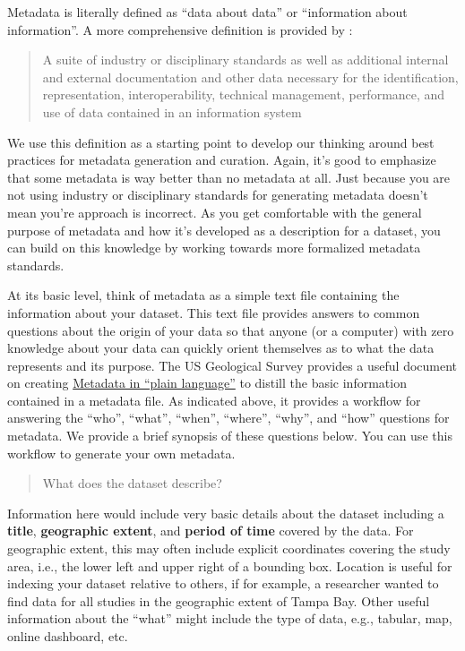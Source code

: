 \documentclass[
]{book}
\begin{document}
Metadata is literally defined as ``data about data'' or ``information about information''. A more comprehensive definition is provided by \citet{Gilliland16}:

\begin{quote}
A suite of industry or disciplinary standards as well as additional internal and external documentation and other data necessary for the identification, representation, interoperability, technical management, performance, and use of data contained in an information system
\end{quote}

We use this definition as a starting point to develop our thinking around best practices for metadata generation and curation. Again, it's good to emphasize that some metadata is way better than no metadata at all. Just because you are not using industry or disciplinary standards for generating metadata doesn't mean you're approach is incorrect. As you get comfortable with the general purpose of metadata and how it's developed as a description for a dataset, you can build on this knowledge by working towards more formalized metadata standards.

At its basic level, think of metadata as a simple text file containing the information about your dataset. This text file provides answers to common questions about the origin of your data so that anyone (or a computer) with zero knowledge about your data can quickly orient themselves as to what the data represents and its purpose. The US Geological Survey provides a useful document on creating \href{https://prd-wret.s3.us-west-2.amazonaws.com/assets/palladium/production/atoms/files/Metadata\%20in\%20Plain\%20Language_508compliant.pdf}{Metadata in ``plain language''} to distill the basic information contained in a metadata file. As indicated above, it provides a workflow for answering the ``who'', ``what'', ``when'', ``where'', ``why'', and ``how'' questions for metadata. We provide a brief synopsis of these questions below. You can use this workflow to generate your own metadata.

\begin{quote}
What does the dataset describe?
\end{quote}

Information here would include very basic details about the dataset including a \textbf{title}, \textbf{geographic extent}, and \textbf{period of time} covered by the data. For geographic extent, this may often include explicit coordinates covering the study area, i.e., the lower left and upper right of a bounding box. Location is useful for indexing your dataset relative to others, if for example, a researcher wanted to find data for all studies in the geographic extent of Tampa Bay. Other useful information about the ``what'' might include the type of data, e.g., tabular, map, online dashboard, etc.
\end{document}
